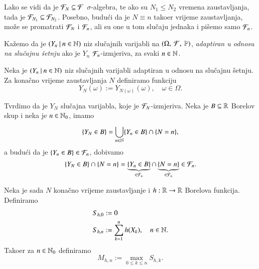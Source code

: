 Lako se vidi da je $\mathcal{F}_N \subseteq \mathcal{F}$ $\sigma$-algebra, te ako su $N_1 \leq N_2$ vremena zaustavljanja, tada je $\mathcal{F}_{N_1} \subseteq \mathcal{F}_{N_2}$.
Posebno, budu\' ci da je $N \equiv n$ tako\dj er vrijeme zaustavljanja, mo\v ze se promatrati $\mathcal{F}_N$ i $\mathcal{F}_n$, ali su one u tom slu\v caju jednaka i pi\v semo samo $\mathcal{F}_n$.

\begin{defn}    \label{defn:15.5-1}
    Ka\v zemo da je $({Y_n} \: | \: {n \in \mathbb{N}})$ niz slu\v cajnih varijabli na $(\Omega, \: \mathcal{F}, \: \mathbb{P})$, \emph{adaptiran u odnosu na slu\v cajnu \v setnju} ako je $Y_n$ $\mathcal{F}_n$-izmjeriva, za svaki $n \in \mathbb{N}$.
\end{defn}

\begin{defn}    \label{defn:15.5-2}
    Neka je $({Y_n} \: | \: {n \in \mathbb{N}})$ niz slu\v cajnih varijabli adaptiran u odnosu na slu\v cajnu \v setnju. Za kona\v cno vrijeme zaustavljanja $N$ definiramo funkciju
    \begin{equation}    \label{jed:15.6}
        Y_N (\omega) := Y_{N (\omega)} (\omega), \quad \omega \in \Omega.
    \end{equation}
\end{defn}

Tvrdimo da je $Y_N$ slu\v cajna varijabla, koje je $\mathcal{F}_N$-izmjeriva.
Neka je $B \subseteq \mathbb{R}$ Borelov skup i neka je $n \in \mathbb{N}_0$, imamo
\begin{equation*}
    \{ Y_N \in B \} = \bigcup\limits_{n \in \mathbb{N}}^{} \{ Y_n \in B \} \cap \{ N = n \},
\end{equation*}
a budu\' ci da je $\{ Y_n \in B \} \in \mathcal{F}_n$, dobivamo
\begin{equation*}
    \{ Y_N \in B \} \cap \{ N = n \} = \underbrace{\{Y_n \in B\}}_{\in \mathcal{F}_n} \cap \underbrace{\{N = n\}}_{\in \mathcal{F}_n} \in \mathcal{F}_n.
\end{equation*}

\begin{defn}    \label{defn:15.5-3}
    Neka je sada $N$ kona\v cno vrijeme zaustavljanje i $h: \mathbb{R} \to \mathbb{R}$ Borelova funkcija.
    Definiramo
    \begin{equation*}
        \begin{aligned}
            S_{h, 0} &:= 0\\
            S_{h, n} &:= \sum\limits_{k = 1}^{n} h(X_k), \quad n \in \mathbb{N}.
        \end{aligned}
    \end{equation*}
    Tako\dj er za $n \in \mathbb{N}_0$ definiramo
    \begin{equation*}
        M_{h, n} := \max\limits_{0 \leq k \leq n} S_{h, k}.
    \end{equation*}
\end{defn}

